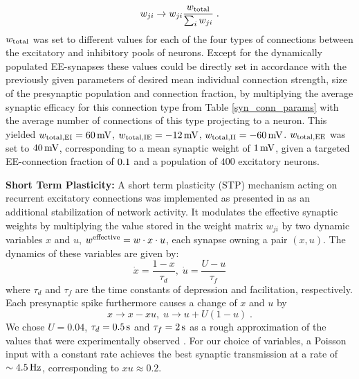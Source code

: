 \documentclass[10pt,letterpaper]{article}
\begin{document}
\begin{equation}
w_{ji} \rightarrow w_{ji} \frac{w_{\rm total}}{\sum_i w_{ji}} \; .
\label{Synnnorm}
\end{equation}
$w_{\rm total}$ was set to different values for each of the four types of connections between the excitatory and inhibitory pools of neurons. Except for the dynamically populated EE-synapses these values could be directly set in accordance with the previously given parameters of desired mean individual connection strength, size of the presynaptic population and connection fraction, by multiplying the average synaptic efficacy for this connection type from Table \ref{syn_conn_params} with the average number of connections of this type projecting to a neuron. This yielded $w_{\rm total,EI} = \rm 60\, mV$, $w_{\rm total,IE} =\rm -12\, mV$, $w_{\rm total,II} = \rm -60\, mV$. $w_{\rm total,EE}$ was set to $\rm 40\, mV$,  corresponding to a mean synaptic weight of $\rm 1\, mV$, given a targeted EE-connection fraction of $\rm 0.1$ and a population of $400$ excitatory neurons.

\textbf{Short Term Plasticity:} A short term plasticity (STP) mechanism acting on recurrent excitatory connections was implemented as presented in \cite{Markram_STP} as an additional stabilization of network activity. It modulates the effective synaptic weights by multiplying the value stored in the weight matrix $w_{ji}$ by two dynamic variables $x$ and $u$, $w^{\rm effective} = w\cdot x \cdot u$, each synapse owning a pair $(x,u)$. The dynamics of these variables are given by:
\begin{equation}
\dot{x} = \frac{1-x}{\tau_d},\; \dot{u} = \frac{U-u}{\tau_f}
\label{STP_dynamics1}
\end{equation}
where $\tau_d$ and $\tau_f$ are the time constants of depression and facilitation, respectively.
Each presynaptic spike furthermore causes a change of $x$ and $u$ by
\begin{equation}
x \rightarrow x - x u,\; u \rightarrow u + U(1-u) \; .
\label{STP_dynamics2}
\end{equation}
We chose $U=0.04$, $\tau_d =\rm 0.5\, s$ and $\tau_f =\rm 2\, s$ as a rough approximation of the values that were experimentally observed \cite{Markram_STP}. For our choice of variables, a Poisson input with a constant rate achieves the best synaptic transmission at a rate of $\sim \rm 4.5\, Hz$, corresponding to $x u \approx 0.2$.   
\end{document}
